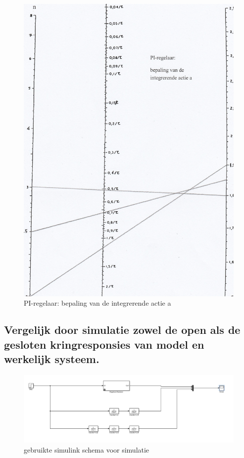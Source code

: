 \documentclass[a4paper, 12pt]{article}
\begin{document}
\begin{figure}[H]
	\includegraphics[width=1\linewidth]{Labo2_2_3.jpg}
	\caption{PI-regelaar: bepaling van de integrerende actie a}
	\label{fig:fig2_2_3}
\end{figure}

\subsection{Vergelijk door simulatie zowel de open als de gesloten kringresponsies van model en werkelijk systeem.}

\begin{figure}[!h]
	\includegraphics[width=1\linewidth]{Labo2_3_systeem.jpg}
	\caption{gebruikte simulink schema voor simulatie}
\end{figure}
\end{document}
